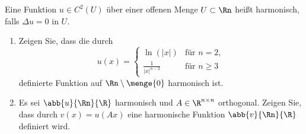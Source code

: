 \begin{exercisePage}
	
	\setcounter{taskcount}{11}
	
	\begin{task}
		Eine Funktion $u\in C^2(U)$ über einer offenen Menge $U\subset\Rn$ heißt harmonisch, falls $\Delta u = 0$ in $U$.
		\begin{enumerate}
			\item Zeigen Sie, dass die durch 
			\begin{equation*}
				u(x)= 
				\begin{cases}
					\ln(|x|) & \text{für } n=2, \\
					\frac{1}{|x|^{n-2}} & \text{für } n\geq 3
				\end{cases}
			\end{equation*}
			definierte Funktion auf $\Rn \setminus \menge{0}$ harmonisch ist.
			
			\item Es sei $\abb{u}{\Rn}{\R}$ harmonisch und $A\in \R^{n\times n}$ orthogonal. Zeigen Sie, dass durch $v(x)= u(Ax)$ eine harmonische Funktion $\abb{v}{\Rn}{\R}$ definiert wird.
		\end{enumerate}
	\end{task}


\end{exercisePage}
